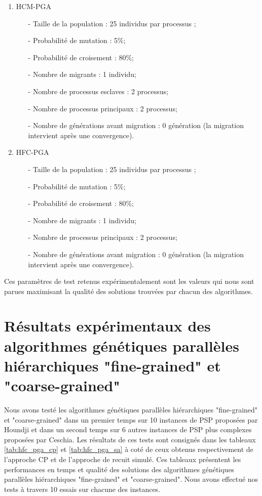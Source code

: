 		\begin{enumerate}
			\item HCM-PGA \\
				\begin{itemize}
					\item[-] Taille de la population : 25 individus par processus ;
			        \item[-] Probabilité de mutation : 5\%;
			        \item[-] Probabilité de croisement : 80\%;
			        \item[-] Nombre de migrants : 1 individu;
		 	        \item[-] Nombre de processus esclaves : 2 processus;
			        \item[-] Nombre de processus principaux : 2 processus;
			        \item[-] Nombre de générations avant migration : 0 génération (la migration intervient après une convergence).
				\end{itemize}
				\vspace*{.5cm}
			\item HFC-PGA \\
				\begin{itemize}
					\item[-] Taille de la population : 25 individus par processus ;
			        \item[-] Probabilité de mutation : 5\%;
			        \item[-] Probabilité de croisement : 80\%;
			        \item[-] Nombre de migrants : 1 individu;
			        \item[-] Nombre de processus principaux : 2 processus;
			        \item[-] Nombre de générations avant migration : 0 génération (la migration intervient après une convergence).
				\end{itemize}
		\end{enumerate}
		Ces paramètres de test retenus expérimentalement sont les valeurs qui nous sont parues maximisant la qualité des solutions trouvées par chacun des algorithmes.		
		
		\section{Résultats expérimentaux des algorithmes génétiques parallèles hiérarchiques "fine-grained" et "coarse-grained"}
		Nous avons testé les algorithmes génétiques parallèles hiérarchiques "fine-grained" et "coarse-grained" dans un premier temps sur 10 instances de PSP proposées par Houndji et dans un second temps sur 6 autres instances de PSP plus complexes proposées par Ceschia. Les résultats de ces tests sont consignés dans les tableaux \ref{tab:hfc_pga_cp} et \ref{tab:hfc_pga_sa} à coté de ceux obtenus respectivement de l'approche CP et de l'approche de recuit simulé. Ces tableaux présentent les performances en temps et qualité des solutions des algorithmes génétiques parallèles hiérarchiques "fine-grained" et "coarse-grained". Nous avons effectué nos tests à travers 10 essais sur chacune des instances.
		
